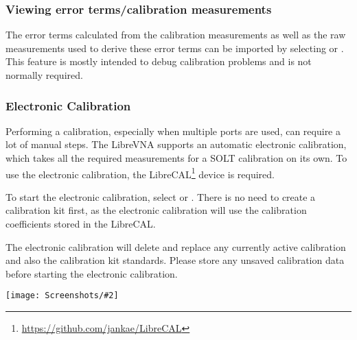 \documentclass[a4paper,11pt]{article}
\newcommand\danger[1][5ex]{%
  \renewcommand\stacktype{L}%
  \scaleto{\stackon[1.3pt]{\color{red}$\triangle$}{\tiny !}}{#1}%
}
\newenvironment{important}[1][]{%
   \begin{mdframed}[%
      backgroundcolor={red!15}, hidealllines=true,
      skipabove=0.7\baselineskip, skipbelow=0.7\baselineskip,
      splitbottomskip=2pt, splittopskip=4pt, #1]%
   \makebox[0pt]{%
      \smash{%
         \hspace*{-45pt}%
         \raisebox{-5pt}{%
            {\danger}%
         }%
      }%
   }%
}{\end{mdframed}}
\newcommand{\vna}{LibreVNA}
\newcommand{\screenshot}[2]{\begin{center}
\texttt{[image: Screenshots/\#2]}
\end{center}}
\begin{document}
\subsubsection{Viewing error terms/calibration measurements}
The error terms calculated from the calibration measurements as well as the raw measurements used to derive these error terms can be imported by selecting  or . This feature is mostly intended to debug calibration problems and is not normally required.

\subsubsection{Electronic Calibration}
Performing a calibration, especially when multiple ports are used, can require a lot of manual steps. The \vna{} supports an automatic electronic calibration, which takes all the required measurements for a SOLT calibration on its own. To use the electronic calibration, the LibreCAL\footnote{\url{https://github.com/jankae/LibreCAL}} device is required.

To start the electronic calibration, select  or . There is no need to create a calibration kit first, as the electronic calibration will use the calibration coefficients stored in the LibreCAL.
\begin{important}
The electronic calibration will delete and replace any currently active calibration and also the calibration kit standards. Please store any unsaved calibration data before starting the electronic calibration.
\end{important}

\screenshot{0.6}{eCal.png}
\end{document}
